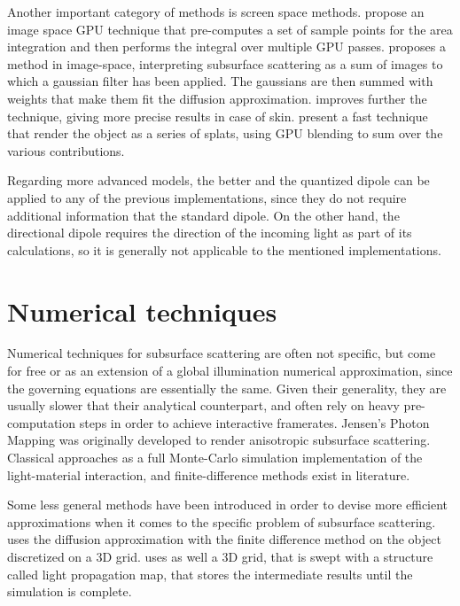 Another important category of methods is screen space methods. \cite{1238246} propose an image space GPU technique that pre-computes a set of sample points for the area integration and then performs the integral over multiple GPU passes. \cite{d'Eon:2007:ERH:2383847.2383869} proposes a method in image-space, interpreting subsurface scattering as a sum of images to which a gaussian filter has been applied. The gaussians are then summed with weights that make them fit the diffusion approximation. \cite{Jimenez:2009:SPR:1609967.1609970} improves further the technique, giving more precise results in case of skin. \cite{4736459} present a fast technique that render the object as a series of splats, using GPU blending to sum over the various contributions.

Regarding more advanced models, the better and the quantized dipole can be applied to any of the previous implementations, since they do not require additional information that the standard dipole. On the other hand, the directional dipole requires the direction of the incoming light as part of its calculations, so it is generally not applicable to the mentioned implementations.  

\section{Numerical techniques}

Numerical techniques for subsurface scattering are often not specific, but come for free or as an extension of a global illumination numerical approximation, since the governing equations are essentially the same. Given their generality, they are usually slower that their analytical counterpart, and often rely on heavy pre-computation steps in order to achieve interactive framerates. Jensen's Photon Mapping\citep{Jensen:1998:ESL:280814.280925} was originally developed to render anisotropic subsurface scattering. Classical approaches as a full Monte-Carlo simulation implementation of the light-material interaction\citep{Dorsey:1999:MRW:311535.311560}, and finite-difference methods exist in literature\citep{raey}. 

Some less general methods have been introduced in order to devise more efficient approximations when it comes to the specific problem of subsurface scattering. \cite{raey} uses the diffusion approximation with the finite difference method on the object discretized on a 3D grid. \cite{Fattal:2009:PMI:1477926.1477933} uses as well a 3D grid, that is swept with a structure called light propagation map, that stores the intermediate results until the simulation is complete. 

